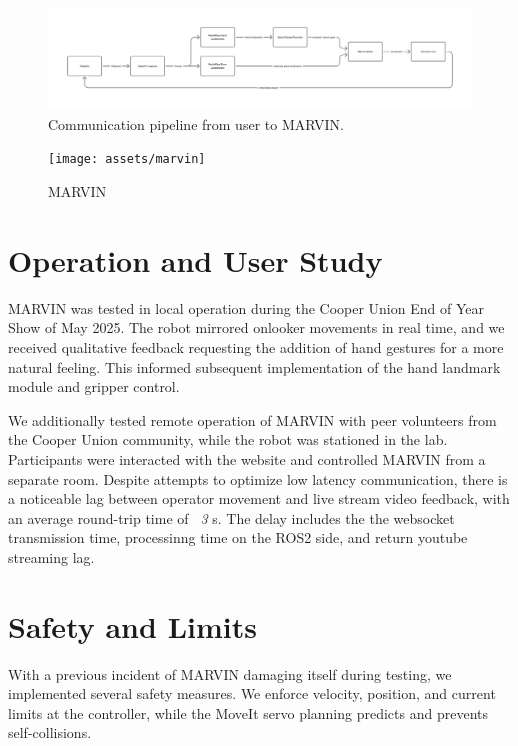 \documentclass[acmsmall, screen]{acmart}
\begin{document}
\begin{figure}[htbp]
  \centering
  \includegraphics[width=\linewidth]{assets/MARVIN Communication Pipeline}
  \caption{Communication pipeline from user to MARVIN.}
  \label{fig:pipeline}
\end{figure}

\begin{figure}[htbp]
  \centering
  \texttt{[image: assets/marvin]}
  \caption{MARVIN}
  \label{fig:photo}
\end{figure}

\section{Operation and User Study}
MARVIN was tested in local operation during the Cooper Union End of Year Show of May 2025. The robot mirrored onlooker movements in real time, and we received qualitative feedback requesting the addition of hand gestures for a more natural feeling. This informed subsequent implementation of the hand landmark module and gripper control. 

We additionally tested remote operation of MARVIN with peer volunteers from the Cooper Union community, while the robot was stationed in the lab. Participants were interacted with the website and controlled MARVIN from a separate room. Despite attempts to optimize low latency communication, there is a noticeable lag between operator movement and live stream video feedback, with an average round-trip time of \textit{~3} s. The delay includes the the websocket transmission time, processinng time on the ROS2 side, and return youtube streaming lag.

\section{Safety and Limits}
With a previous incident of MARVIN damaging itself during testing, we implemented several safety measures. We enforce velocity, position, and current limits at the controller, while the MoveIt servo planning predicts and prevents self-collisions.
\end{document}

